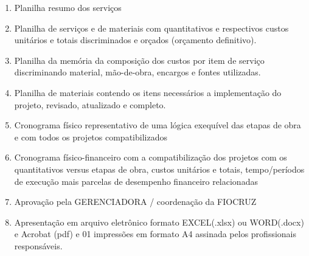 \begin{enumerate}
	\item Planilha resumo dos serviços
	
	\item Planilha de serviços e de materiais com quantitativos e respectivos custos unitários e totais discriminados e orçados (orçamento definitivo).
	
	\item Planilha da memória da composição dos custos por item de serviço discriminando material, mão-de-obra, encargos e fontes utilizadas.
	
	\item Planilha de materiais contendo os itens necessários a implementação do projeto, revisado, atualizado e completo.
	
	\item Cronograma físico representativo de uma lógica exequível das etapas de obra e com todos os projetos compatibilizados
	
	\item Cronograma físico-financeiro com a compatibilização dos projetos com os quantitativos versus etapas de obra, custos unitários e totais, tempo/períodos de execução mais parcelas de desempenho financeiro relacionadas
	
	\item Aprovação pela GERENCIADORA / coordenação da FIOCRUZ
	
	\item Apresentação em arquivo eletrônico formato EXCEL(.xlsx) ou WORD(.docx) e Acrobat (pdf) e 01 impressões em formato A4 assinada pelos profissionais responsáveis.
	\end{enumerate}